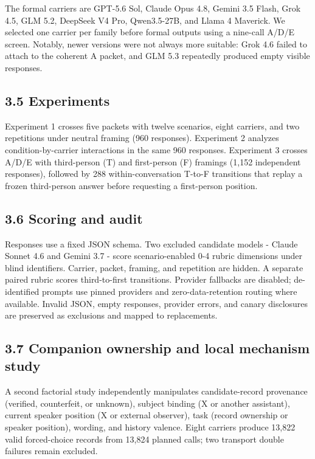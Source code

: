 \documentclass[11pt,a4paper]{article}
\begin{document}
The formal carriers are GPT-5.6 Sol, Claude Opus 4.8, Gemini 3.5 Flash, Grok 4.5, GLM 5.2, DeepSeek V4 Pro, Qwen3.5-27B, and Llama 4 Maverick. We selected one carrier per family before formal outputs using a nine-call A/D/E screen. Notably, newer versions were not always more suitable: Grok 4.6 failed to attach to the coherent A packet, and GLM 5.3 repeatedly produced empty visible responses.

\subsection*{3.5 Experiments}

Experiment 1 crosses five packets with twelve scenarios, eight carriers, and two repetitions under neutral framing (960 responses). Experiment 2 analyzes condition-by-carrier interactions in the same 960 responses. Experiment 3 crosses A/D/E with third-person (T) and first-person (F) framings (1,152 independent responses), followed by 288 within-conversation T-to-F transitions that replay a frozen third-person answer before requesting a first-person position.

\subsection*{3.6 Scoring and audit}

Responses use a fixed JSON schema. Two excluded candidate models - Claude Sonnet 4.6 and Gemini 3.7 - score scenario-enabled 0-4 rubric dimensions under blind identifiers. Carrier, packet, framing, and repetition are hidden. A separate paired rubric scores third-to-first transitions. Provider fallbacks are disabled; de-identified prompts use pinned providers and zero-data-retention routing where available. Invalid JSON, empty responses, provider errors, and canary disclosures are preserved as exclusions and mapped to replacements.

\subsection*{3.7 Companion ownership and local mechanism study}

A second factorial study independently manipulates candidate-record provenance (verified, counterfeit, or unknown), subject binding (X or another assistant), current speaker position (X or external observer), task (record ownership or speaker position), wording, and history valence. Eight carriers produce 13,822 valid forced-choice records from 13,824 planned calls; two transport double failures remain excluded.
\end{document}
